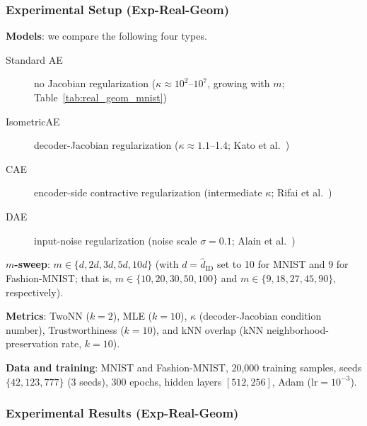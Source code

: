 \documentclass[make,article,submit,pdftex,moreauthors]{Definitions/mdpi}
\newcommand{\kap}{\kappa}
\begin{document}
\subsubsection*{Experimental Setup (Exp-Real-Geom)}

\textbf{Models}: we compare the following four types.
\begin{description}
  \item[Standard AE] no Jacobian regularization ($\kap \approx 10^2$--$10^7$, growing with $m$; Table~\ref{tab:real_geom_mnist})
  \item[IsometricAE] decoder-Jacobian regularization ($\kap \approx 1.1$--1.4; Kato et al.~\cite{kato2020rdae})
  \item[CAE] encoder-side contractive regularization (intermediate $\kap$; Rifai et al.~\cite{rifai2011cae})
  \item[DAE] input-noise regularization (noise scale $\sigma=0.1$; Alain et al.~\cite{alain2014dae})
\end{description}

\textbf{$m$-sweep}: $m \in \{d, 2d, 3d, 5d, 10d\}$
(with $d = \hat{d}_\mathrm{ID}$ set to 10 for MNIST and 9 for Fashion-MNIST;
that is, $m \in \{10, 20, 30, 50, 100\}$ and $m \in \{9, 18, 27, 45, 90\}$,
respectively).

\textbf{Metrics}: TwoNN ($k=2$), MLE ($k=10$), $\kap$ (decoder-Jacobian
condition number), Trustworthiness ($k=10$), and kNN overlap (kNN
neighborhood-preservation rate, $k=10$).

\textbf{Data and training}: MNIST and Fashion-MNIST, 20,000 training samples,
seeds $\{42, 123, 777\}$ (3 seeds), 300 epochs, hidden layers $[512, 256]$,
Adam (lr$=10^{-3}$).

\subsubsection*{Experimental Results (Exp-Real-Geom)}
\end{document}
